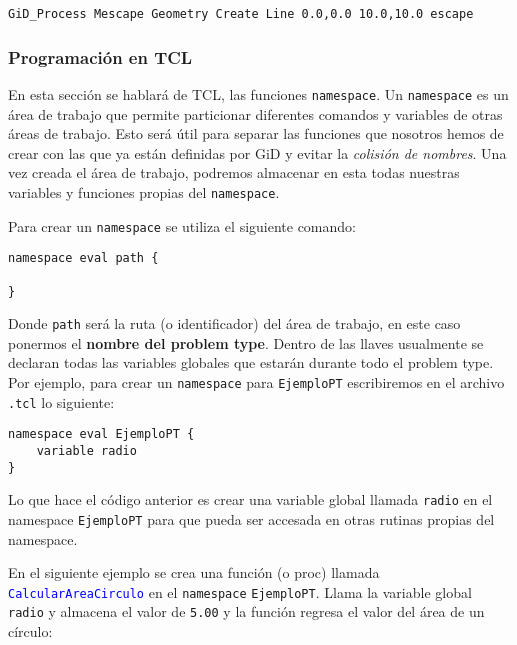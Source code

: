 \documentclass[10pt, a4paper, twocolumn]{article}
\begin{document}
\lstset{language=tcl} 
\begin{lstlisting}[caption={Dibujar una línea en código en código.}]
GiD_Process Mescape Geometry Create Line 0.0,0.0 10.0,10.0 escape
\end{lstlisting}


\subsubsection{Programación en TCL}

En esta sección se hablará de TCL, las funciones \texttt{namespace}. Un \texttt{namespace} es un área de trabajo que permite particionar diferentes comandos y variables de otras áreas de trabajo. Esto será útil para separar las funciones que nosotros hemos de crear con las que ya están definidas por GiD y evitar la \textit{colisión de nombres}. Una vez creada el área de trabajo, podremos almacenar en esta todas nuestras variables y funciones propias del \texttt{namespace}.

Para crear un \texttt{namespace} se utiliza el siguiente comando:

\lstset{language=tcl} 
\begin{lstlisting}[caption={Crear un namespace en TCL.}]
namespace eval path {

}
\end{lstlisting}

Donde \texttt{path} será la ruta (o identificador) del área de trabajo, en este caso ponermos el \textbf{nombre del problem type}. Dentro de las llaves usualmente se declaran todas las variables globales que estarán durante todo el problem type. Por ejemplo, para crear un \texttt{namespace} para \texttt{EjemploPT} escribiremos en el archivo \texttt{.tcl} lo siguiente:

\lstset{language=tcl} 
\begin{lstlisting}[caption={Declarar una variable propia del namespace.}]
namespace eval EjemploPT {
	variable radio
}
\end{lstlisting}

Lo que hace el código anterior es crear una variable global llamada \texttt{radio} en el namespace \texttt{EjemploPT} para que pueda ser accesada en otras rutinas propias del namespace.

En el siguiente ejemplo se crea una función (o proc) llamada \textcolor{blue}{\texttt{CalcularAreaCirculo}} en el \texttt{namespace} \texttt{EjemploPT}. Llama la variable global \texttt{radio} y almacena el valor de \texttt{5.00} y la función regresa el valor del área de un círculo:
\end{document}
